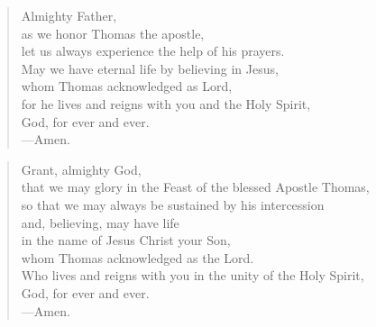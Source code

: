 \prayer

\setlength{\vleftmargin}{\prayerleftmargini}

\begin{verse}
Almighty Father,\\
as we honor Thomas the apostle,\\
let us always experience the help of his prayers.\\
May we have eternal life by believing in Jesus,\\
whom Thomas acknowledged as Lord,\\
for he lives and reigns with you and the Holy Spirit,\\
God, for ever and ever.\\
{\color{red}---\thinspace}Amen.
\end{verse}


\begin{verse}
Grant, almighty God,\\
that we may glory in the Feast of the blessed Apostle Thomas,\\
so that we may always be sustained by his intercession\\
and, believing, may have life\\
in the name of Jesus Christ your Son,\\
whom Thomas acknowledged as the Lord.\\
Who lives and reigns with you in the unity of the Holy Spirit,\\
God, for ever and ever.\\
{\color{red}---\thinspace}Amen.
\end{verse}

\setlength{\vleftmargin}{\defleftmargini}